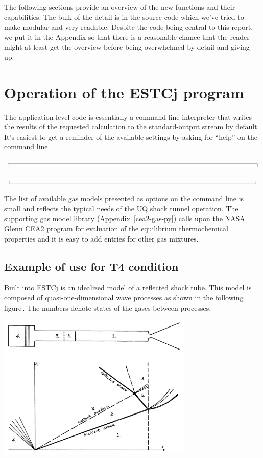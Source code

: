 \documentclass[10pt,a4paper]{article}
\newcommand{\topbar}{\ensuremath{
    \rule{0.1mm}{2.0mm} \rule[2.0mm]{159.5mm}{0.1mm} \rule{0.1mm}{2.0mm}
}}
\newcommand{\bottombar}{\ensuremath{
    \rule{0.1mm}{2.0mm} \rule{159.5mm}{0.1mm} \rule{0.1mm}{2.0mm}
}}
\begin{document}
\medskip
The following sections provide an overview of the new functions and their capabilities.
The bulk of the detail is in the source code which we've tried to make modular and very readable.
Despite the code being central to this report, we put it in the Appendix so that there is
a reasonable chance that the reader might at least get the overview 
before being overwhelmed by detail and giving up.

\newpage
\section{Operation of the ESTCj program}
%
The application-level code is essentially a command-line interpreter
that writes the results of the requested calculation to the standard-output stream
by default.
It's easiest to get a reminder of the available settings by asking for ``help''
on the command line.

\medskip
\noindent\topbar

\bottombar

The list of available gas models presented as options on the command line is small
and reflects the typical needs of the UQ shock tunnel operation.
The supporting gas model library (Appendix~\ref{cea2-gas-py}) 
calls upon the NASA Glenn CEA2 program 
for evaluation of the equilibrium thermochemical properties 
and it is easy to add entries for other gas mixtures.

\bigskip
\subsection{Example of use for T4 condition}
%
Built into ESTCj is an idealized model of a reflected shock tube.
This model is composed of quasi-one-dimensional wave processes 
as shown in the following figure\,\cite{krek_jacobs_93}.
The numbers denote states of the gases between processes.

\begin{center}
\includegraphics[width=0.7\textwidth]{../figs/shock-tube-process-fig-from-stn-report.png}
\end{center}
\end{document}
